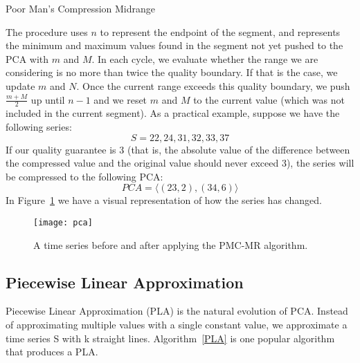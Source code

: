 \begin{algorithm}
\caption{Poor Man's Compression Midrange \cite{Lazaridis2003Capturing}}\label{PMC_MR}
\begin{algorithmic}[1]
    \Else
    \EndIf
\EndWhile
{}
\EndProcedure
\end{algorithmic}
\end{algorithm}

The procedure uses $n$ to represent the endpoint of the segment, and represents the
minimum and maximum values found in the segment not yet pushed to the PCA with $m$ and
$M$. In each cycle, we evaluate whether the range we are considering is no more than
twice the quality boundary. If that is the case, we update $m$ and $N$. Once the current
range exceeds this quality boundary, we push $\frac{m + M}{2}$  up until $n - 1$ and we
reset $m$ and $M$ to the current value (which was not included in the current segment).
As a practical example, suppose we have the following series:
$$S = 22, 24, 31, 32, 33, 37$$
If our quality guarantee is 3 (that is, the absolute value of the difference between the
compressed value and the original value should never exceed 3), the series will be
compressed to the following PCA:
$$PCA = \langle(23, 2), (34, 6) \rangle$$
In Figure~\ref{pca} we have a visual representation of how the series has changed.

\begin{figure}[!htbp]
\begin{center}
\texttt{[image: pca]}
\caption[pca]{A time series before and after applying the PMC-MR algorithm.}
\label{pca}
\end{center}
\end{figure}

\subsection{Piecewise Linear Approximation}
Piecewise Linear Approximation (PLA) is the natural evolution of PCA. Instead of
approximating multiple values with a single constant value, we approximate a time series
S with k straight lines. Algorithm~\ref{PLA} is one popular algorithm that produces a PLA.


